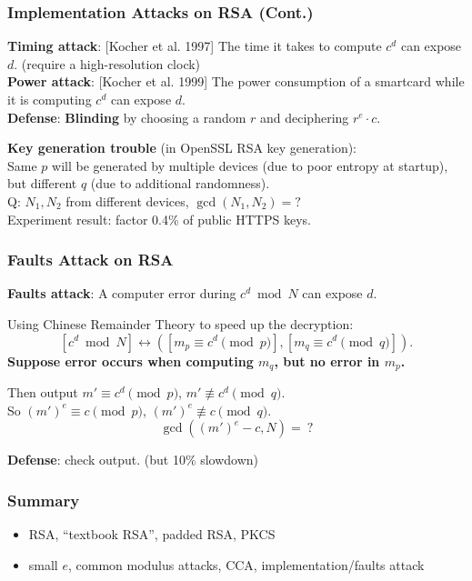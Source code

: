 \begin{frame}\frametitle{Implementation Attacks on RSA (Cont.) }
\textbf{Timing attack}: [Kocher et al. 1997] 
The time it takes to compute $c^d$ can expose $d$. (require a high-resolution clock)\\
\textbf{Power attack}: [Kocher et al. 1999]
The power consumption of a smartcard while it is computing $c^d$ can expose $d$.\\
\textbf{Defense}: \textbf{Blinding} by choosing a random $r$ and deciphering $r^{e}\cdot c$. 
\newline

\textbf{Key generation trouble} (in OpenSSL RSA key generation):\\
Same $p$ will be generated by multiple devices (due to poor entropy at startup), but different $q$ (due to additional randomness).\\
\alert{Q: $N_1,N_2$ from different devices, $\gcd(N_1,N_2) = ?$}\\
Experiment result: factor 0.4\% of public HTTPS keys.
\end{frame}
\begin{frame}\frametitle{Faults Attack on RSA}
\textbf{Faults attack}:
A computer error during $c^d\bmod N$ can expose $d$.\newline

Using Chinese Remainder Theory to speed up the decryption:
\[ [c^d \bmod N] \leftrightarrow ([m_p \equiv c^d \pmod p],[m_q \equiv c^d \pmod q]).\]
\textbf{Suppose error occurs when computing $m_q$, but no error in $m_p$.}\newline

Then output $m' \equiv c^d \pmod p$, $m' \not \equiv c^d \pmod q$.\\
So $(m')^e \equiv c \pmod p$, $(m')^e \not \equiv c \pmod q$.\\
\alert{\[\gcd((m')^e-c, N)=\ ?\]}

\textbf{Defense}: check output. (but 10\% slowdown)
\end{frame}
\begin{frame}\frametitle{Summary}
\begin{itemize}
\item RSA, ``textbook RSA'', padded RSA, PKCS
\item small $e$, common modulus attacks, CCA, implementation/faults attack
\end{itemize}
\end{frame}
